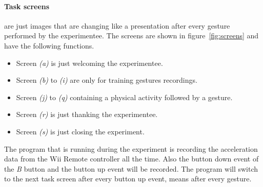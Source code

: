 \documentclass[runningheads,a4paper]{llncs}
\begin{document}
    \paragraph{Task screens} are just images that are changing like a presentation after every gesture performed by the
    experimentee. The screens are shown in figure~\ref{fig:screens} and have the following functions.
    \begin{itemize}
        \item Screen \textit{(a)} is just welcoming the experimentee.
        \item Screen \textit{(b)} to \textit{(i)} are only for training gestures recordings.
        \item Screen \textit{(j)} to \textit{(q)} containing a physical activity followed by a gesture.
        \item Screen \textit{(r)} is just thanking the experimentee.
        \item Screen \textit{(s)} is just closing the experiment.
    \end{itemize}
    The program that is running during the experiment is recording the acceleration data from the Wii Remote controller
    all the time. Also the button down event of the \textit{B} button and the button up event will be recorded. The
    program will switch to the next task screen after every button up event, means after every gesture.
\end{document}
